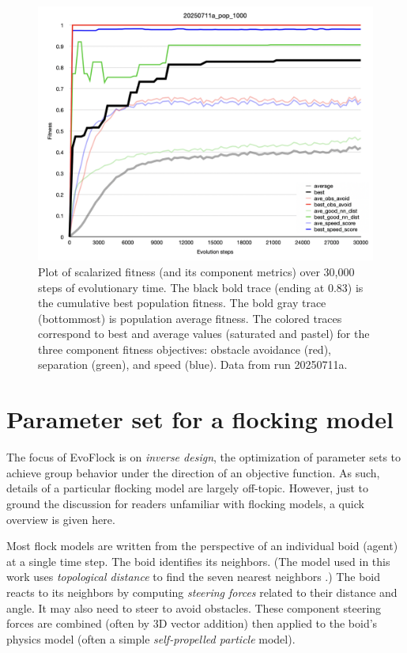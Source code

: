 \documentclass[letterpaper]{article}
\begin{document}


\begin{figure}[]
    \centering
    \includegraphics[width=\linewidth]{images/temp_fit_plot.png}
    \caption{Plot of scalarized fitness (and its component metrics) over 30,000 steps of evolutionary time. The black bold trace (ending at 0.83) is the cumulative best population fitness. The bold gray trace (bottommost) is population average fitness. The colored traces correspond to best and average values (saturated and pastel) for the three component fitness objectives: obstacle avoidance (red), separation (green), and speed (blue). Data from run 20250711a.}
    \label{fig:fit_plot}
\end{figure}

\section{Parameter set for a flocking model}
\label{sec:parameter_set}

The focus of EvoFlock is on \textit{inverse design}, the optimization of parameter sets to achieve group behavior under the direction of an objective function. As such, details of a particular flocking model are largely off-topic. However, just to ground the discussion for readers unfamiliar with flocking models, a quick overview is given here.

Most flock models are written from the perspective of an individual boid (agent) at a single time step. The boid identifies its neighbors. (The model used in this work uses \textit{topological distance} to find the seven nearest neighbors \citep{cavagna_seventh_2008}.) The boid reacts to its neighbors by computing \textit{steering forces} related to their distance and angle. It may also need to steer to avoid obstacles. These component steering forces are combined (often by 3D vector addition) then applied to the boid's physics model (often a simple \textit{self-propelled particle} model).
\end{document}
